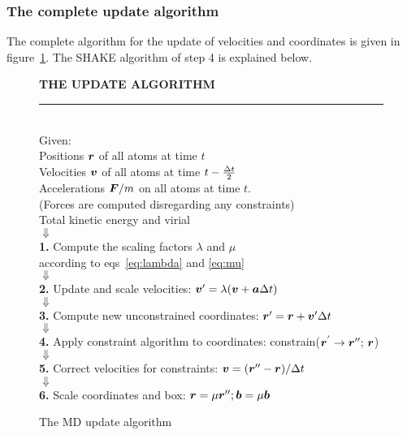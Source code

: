\subsubsection*{The complete update algorithm}
The complete algorithm for the update of velocities and coordinates is
given in figure~\ref{fig:complete-update}. The SHAKE algorithm of step
4 is explained below. 
\begin{figure}
\begin{center}
\addtolength{\fboxsep}{0.5cm}
\begin{shadowenv}[12cm]
{\large \bf THE UPDATE ALGORITHM}
\rule{\textwidth}{2pt} \\
Given:\\
Positions $\mbox{\boldmath ${r}$}$ of all atoms at time $t$ \\
Velocities $\mbox{\boldmath ${v}$}$ of all atoms at time $t-{\frac {\Delta t}{2}}$ \\
Accelerations $\mbox{\boldmath ${F}$}/m$ on all atoms at time $t$.\\
(Forces are computed disregarding any constraints)\\
Total kinetic energy and virial \\
$\Downarrow$ \\
{\bf 1.} Compute the scaling factors $\lambda$ and $\mu$\\
according to eqs~\ref{eq:lambda} and \ref{eq:mu}\\   
$\Downarrow$ \\
{\bf 2.} Update and scale velocities: $\mbox{\boldmath ${v}$}' =  \lambda (\mbox{\boldmath ${v}$} +
\mbox{\boldmath ${a}$} \Delta t)$ \\
$\Downarrow$ \\
{\bf 3.} Compute new unconstrained coordinates: $\mbox{\boldmath ${r}$}' = \mbox{\boldmath ${r}$} + \mbox{\boldmath ${v}$}'
\Delta t$ \\
$\Downarrow$ \\
{\bf 4.} Apply constraint algorithm to coordinates: constrain($\mbox{\boldmath ${r}$}^{'} \rightarrow  \mbox{\boldmath ${r}$}'';
\,  \mbox{\boldmath ${r}$}$) \\
$\Downarrow$ \\
{\bf 5.} Correct velocities for constraints: $\mbox{\boldmath ${v}$} = (\mbox{\boldmath ${r}$}'' -
\mbox{\boldmath ${r}$}) / \Delta t$ \\
$\Downarrow$ \\
{\bf 6.} Scale coordinates and box: $\mbox{\boldmath ${r}$} = \mu \mbox{\boldmath ${r}$}''; \mbox{\boldmath ${b}$} =
\mu  \mbox{\boldmath ${b}$}$ \\
\end{shadowenv}
\caption{The MD update algorithm}
\label{fig:complete-update}
\end{center}
\end{figure}

